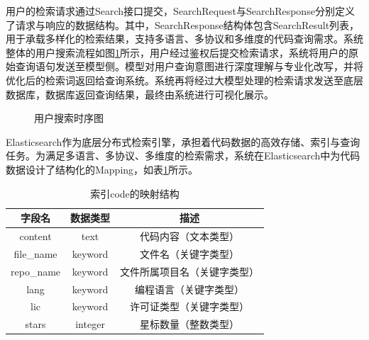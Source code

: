\documentclass[UTF8,a4paper,12pt]{ctexart}
\numberwithin{equation}{section}
\begin{document}
用户的检索请求通过Search接口提交，SearchRequest与SearchResponse分别定义了请求与响应的数据结构。其中，SearchResponse结构体包含SearchResult列表，用于承载多样化的检索结果，支持多语言、多协议和多维度的代码查询需求。系统整体的用户搜索流程如图\ref{timeline}所示，用户经过鉴权后提交检索请求，系统将用户的原始查询语句发送至模型侧。模型对用户查询意图进行深度理解与专业化改写，并将优化后的检索词返回给查询系统。系统再将经过大模型处理的检索请求发送至底层数据库，数据库返回查询结果，最终由系统进行可视化展示。\par
\begin{figure}[H]
	\caption{用户搜索时序图}
	\label{timeline}
\end{figure}
Elasticsearch作为底层分布式检索引擎，承担着代码数据的高效存储、索引与查询任务。为满足多语言、多协议、多维度的检索需求，系统在Elasticsearch中为代码数据设计了结构化的Mapping，如表\ref{esmapping}所示。
\begin{table}[H]
	\centering
	\caption{索引code的映射结构}
	\label{tab:code_mapping}
	\small
	\begin{tabular}{c c c}
		\toprule
		字段名 & 数据类型 & 描述 \\
		\midrule
		content & text & 代码内容（文本类型） \\
		file\_name & keyword & 文件名（关键字类型） \\
		repo\_name & keyword & 文件所属项目名（关键字类型）\\
		lang & keyword & 编程语言（关键字类型） \\
		lic & keyword & 许可证类型（关键字类型） \\
		stars & integer & 星标数量（整数类型） \\
		\bottomrule
	\end{tabular}
	\label{esmapping}
\end{table}
\end{document}
